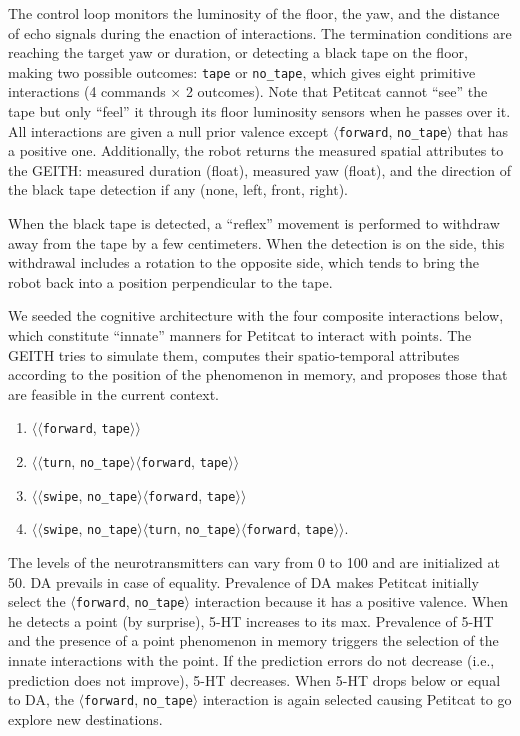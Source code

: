 \documentclass[runningheads]{llncs}
\begin{document}
The control loop monitors the luminosity of the floor, the yaw, and the distance of echo signals during the enaction of interactions. 
The termination conditions are reaching the target yaw or duration, or detecting a black tape on the floor, making two possible outcomes: \texttt{tape} or \texttt{no\_tape}, which gives eight primitive interactions (4 commands $\times$ 2 outcomes).
Note that Petitcat cannot ``see'' the tape but only ``feel'' it through its floor luminosity sensors when he passes over it.
All interactions are given a null prior valence except $\langle$\texttt{forward}, \texttt{no\_tape}$\rangle$ that has a positive one.
Additionally, the robot returns the measured spatial attributes to the GEITH: measured duration (float), measured yaw (float), and the direction of the black tape detection if any (none, left, front, right). 

When the black tape is detected, a ``reflex'' movement is performed to withdraw away from the tape by a few centimeters. 
When the detection is on the side, this withdrawal includes a rotation to the opposite side, which tends to bring the robot back into a position perpendicular to the tape.

We seeded the cognitive architecture with the four composite interactions below, which constitute ``innate'' manners for Petitcat to interact with points. 
The GEITH tries to simulate them, computes their spatio-temporal attributes according to the position of the phenomenon in memory, and proposes those that are feasible in the current context.
\begin{enumerate}
	\item $\langle\langle$\texttt{forward}, \texttt{tape}$\rangle\rangle$
	\item $\langle\langle$\texttt{turn}, \texttt{no\_tape}$\rangle\langle$\texttt{forward}, \texttt{tape}$\rangle\rangle$
	\item $\langle\langle$\texttt{swipe}, \texttt{no\_tape}$\rangle\langle$\texttt{forward}, \texttt{tape}$\rangle\rangle$
	\item $\langle\langle$\texttt{swipe}, \texttt{no\_tape}$\rangle\langle$\texttt{turn}, \texttt{no\_tape}$\rangle\langle$\texttt{forward}, \texttt{tape}$\rangle\rangle$. 
\end{enumerate}

The levels of the neurotransmitters can vary from 0 to 100 and are initialized at 50. DA prevails in case of equality.
Prevalence of DA makes Petitcat initially select the $\langle$\texttt{forward}, \texttt{no\_tape}$\rangle$ interaction because it has a positive valence.
When he detects a point (by surprise), 5-HT increases to its max. 
Prevalence of 5-HT and the presence of a point phenomenon in memory triggers the selection of the innate interactions with the point.
If the prediction errors do not decrease (i.e., prediction does not improve), 5-HT decreases.
When 5-HT drops below or equal to DA, the  $\langle$\texttt{forward}, \texttt{no\_tape}$\rangle$ interaction is again selected causing Petitcat to go explore new destinations. 
\end{document}
